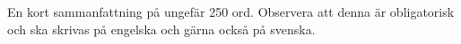 En kort sammanfattning på ungefär 250 ord. Observera att denna är obligatorisk och ska skrivas på engelska och gärna också på svenska.
